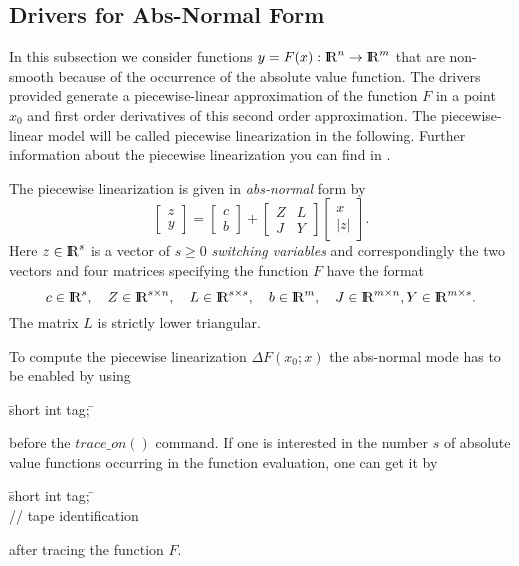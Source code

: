 %
\subsection{Drivers for Abs-Normal Form}
\label{absdrivers}
%
In this subsection we consider functions $y=F(x):{ {\rm I} \kern -.225em {\rm R} }^n \rightarrow { {\rm I} \kern -.225em {\rm R} }^m$ that are non-smooth because of the occurrence of 
the absolute value function. The drivers provided generate a piecewise-linear 
approximation of the function $F$ in a point $x_0$ and first order derivatives of 
this second order approximation. The piecewise-linear model will be called piecewise 
linearization in the following. Further information about the piecewise linearization 
you can find in \cite{Griewank13}.

The piecewise linearization is given in \textit{abs-normal} form by 
\[ \left[\begin{array}{c}
          z\\y
         \end{array}\right]
   =\left[\begin{array}{c}
          c\\b
         \end{array}\right]      
    +\left[\begin{array}{cc}
          Z & L\\ J & Y
         \end{array}\right] 
    \left[\begin{array}{c}
          x\\|z|
         \end{array}\right].
\]
Here $z\in{ {\rm I} \kern -.225em {\rm R} }^s$ is a vector of $s\ge 0$ \textit{switching variables} and correspondingly 
the two vectors and four matrices specifying the function $F$ have the format
\[c\in{ {\rm I} \kern -.225em {\rm R} }^s,\quad Z\in{ {\rm I} \kern -.225em {\rm R} }^{s\times n},\quad L\in{ {\rm I} \kern -.225em {\rm R} }^{s\times s},\quad b\in { {\rm I} \kern -.225em {\rm R} }^m,\quad J\in{ {\rm I} \kern -.225em {\rm R} }^{m\times n}, Y\in{ {\rm I} \kern -.225em {\rm R} }^{m\times s}.\]
The matrix $L$ is strictly lower triangular.

To compute the piecewise linearization $\Delta F(x_0;x)$ the abs-normal mode has to be 
enabled by using
\begin{tabbing}
\hspace{0.5in}\={\sf short int tag;} \hspace{1.1in}\= \kill    %
\end{tabbing}
before the $\mathit{trace\_on}()$ command.
If one is interested in the number $s$ of absolute value functions occurring in the function 
evaluation, one can get it by
\begin{tabbing}
\hspace{0.5in}\={\sf short int tag;} \hspace{1.1in}\= \kill    %
\\
         \> // tape identification 
\end{tabbing}
after tracing the function $F$.

